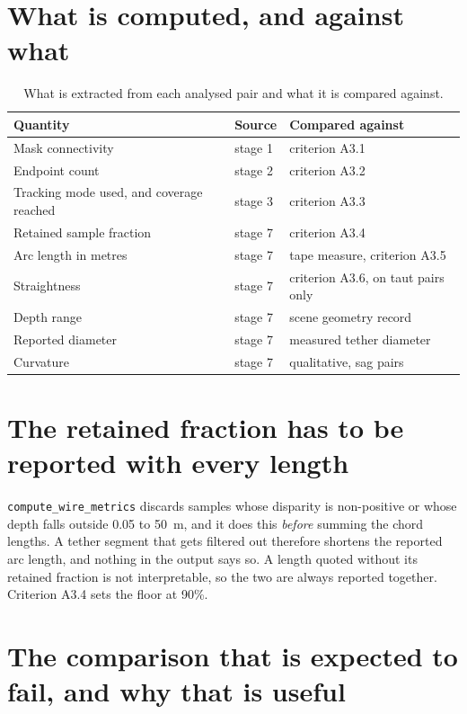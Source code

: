 \section{What is computed, and against what}

\begin{table}[htbp]
\centering
\caption[Analysis outputs]{What is extracted from each analysed pair and what
it is compared against.}
\label{tab:analysis}
\begin{tabularx}{\textwidth}{@{}l X X@{}}
\toprule
\textbf{Quantity} & \textbf{Source} & \textbf{Compared against} \\
\midrule
Mask connectivity & stage 1 & criterion A3.1 \\
Endpoint count & stage 2 & criterion A3.2 \\
Tracking mode used, and coverage reached & stage 3 & criterion A3.3 \\
Retained sample fraction & stage 7 & criterion A3.4 \\
Arc length in metres & stage 7 & tape measure, criterion A3.5 \\
Straightness & stage 7 & criterion A3.6, on taut pairs only \\
Depth range & stage 7 & scene geometry record \\
Reported diameter & stage 7 & measured tether diameter \\
Curvature & stage 7 & qualitative, sag pairs \\
\bottomrule
\end{tabularx}
\end{table}

\section{The retained fraction has to be reported with every length}

\texttt{compute\_wire\_metrics} discards samples whose disparity is
non-positive or whose depth falls outside 0.05 to 50~m, and it does this
\emph{before} summing the chord lengths. A tether segment that gets filtered
out therefore shortens the reported arc length, and nothing in the output
says so. A length quoted without its retained fraction is not interpretable,
so the two are always reported together. Criterion A3.4 sets the floor at
90\%.

\section{The comparison that is expected to fail, and why that is useful}

